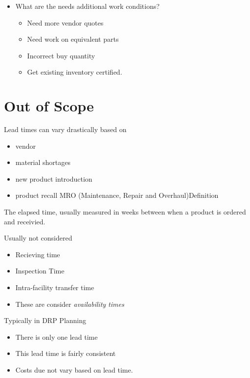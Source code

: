 \documentclass[letterpaper,10pt,english]{sphinxmanual}
\begin{document}
\begin{enumerate}
\begin{itemize}
\item {} 
What are the needs additional work conditions?
\begin{itemize}
\item {} 
Need more vendor quotes

\item {} 
Need work on equivalent parts

\item {} 
Incorrect buy quantity

\item {} 
Get existing inventory certified.

\end{itemize}

\end{itemize}

\end{enumerate}


\section{Out of Scope}
\label{Questions:out-of-scope}
Lead times can vary drastically based on
\begin{itemize}
\item {} 
vendor

\item {} 
material shortages

\item {} 
new product introduction

\item {} 
product recall MRO (Maintenance, Repair and Overhaul)Definition

\end{itemize}

The elapsed time, usually measured in weeks between when a product
is ordered and receivied.

Usually not considered
\begin{itemize}
\item {} 
Recieving time

\item {} 
Inspection Time

\item {} 
Intra-facility transfer time

\item {} 
These are consider \emph{availability times}

\end{itemize}

Typically in DRP Planning
\begin{itemize}
\item {} 
There is only one lead time

\item {} 
This lead time is fairly consistent

\item {} 
Costs due not vary based on lead time.

\end{itemize}
\end{document}

